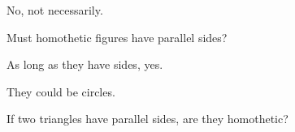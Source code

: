 



No, not necessarily.

Must homothetic figures have parallel sides?













As long as they have sides, yes.

They could be circles.





If two triangles have parallel sides, are they homothetic?


